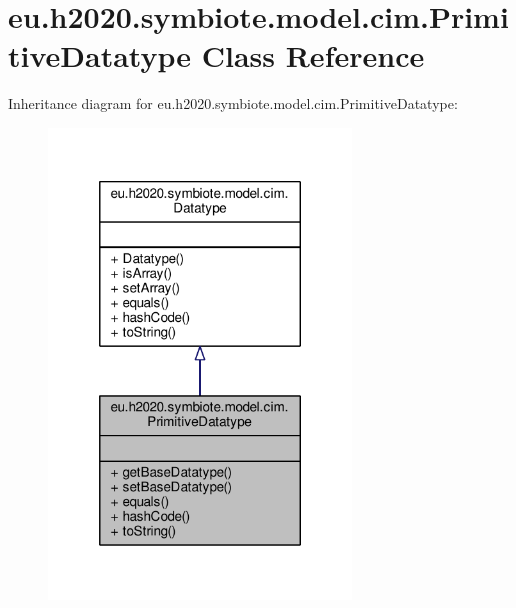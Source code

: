 \hypertarget{classeu_1_1h2020_1_1symbiote_1_1model_1_1cim_1_1PrimitiveDatatype}{}\section{eu.\+h2020.\+symbiote.\+model.\+cim.\+Primitive\+Datatype Class Reference}
\label{classeu_1_1h2020_1_1symbiote_1_1model_1_1cim_1_1PrimitiveDatatype}


Inheritance diagram for eu.\+h2020.\+symbiote.\+model.\+cim.\+Primitive\+Datatype\+:\nopagebreak
\begin{figure}[H]
\begin{center}
\leavevmode
\includegraphics[width=228pt]{classeu_1_1h2020_1_1symbiote_1_1model_1_1cim_1_1PrimitiveDatatype__inherit__graph}
\end{center}
\end{figure}


